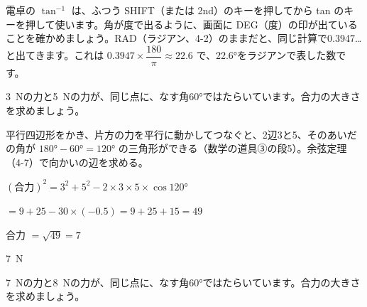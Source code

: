 \noindent\begin{minipage}[c]{0.56\linewidth}\raggedright
電卓の $\tan^{-1}$ は、ふつう SHIFT（または 2nd）のキーを押してから tan のキーを押して使います。角が度で出るように、画面に DEG（度）の印が出ていることを確かめましょう。RAD（ラジアン、4-2）のままだと、同じ計算で0.3947…と出てきます。これは $0.3947\times\dfrac{180}{\pi}\approx22.6$ で、22.6°をラジアンで表した数です。
\end{minipage}\hfill
\begin{minipage}[c]{0.4\linewidth}\centering
{}
\end{minipage}

\begin{reidai}
\qty{3}{N}の力と\qty{5}{N}の力が、同じ点に、なす角60°ではたらいています。合力の大きさを求めましょう。\par
\kangaekata 平行四辺形をかき、片方の力を平行に動かしてつなぐと、2辺3と5、そのあいだの角が $180°-60°=120°$ の三角形ができる（数学の道具③の段5）。余弦定理（4-7）で向かいの辺を求める。\par
\shiki $(\text{合力})^2=3^2+5^2-2\times3\times5\times\cos120°$\par
\hspace*{4.6\zw}$=9+25-30\times(-0.5)=9+25+15=49$\par
\hspace*{2.6\zw}合力 $=\sqrt{49}=7$\par
\kotae \qty{7}{N}
\end{reidai}

\begin{jibun}
\qty{7}{N}の力と\qty{8}{N}の力が、同じ点に、なす角60°ではたらいています。合力の大きさを求めましょう。
\end{jibun}

